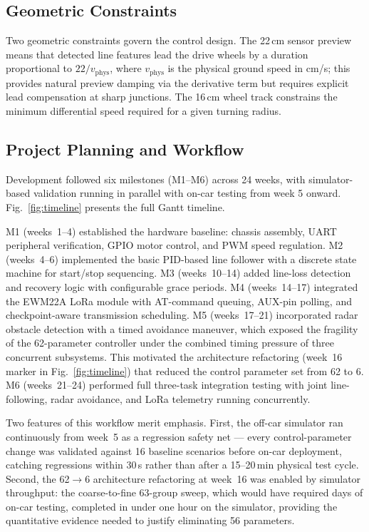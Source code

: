\documentclass[letterpaper,journal]{IEEEtran}
\begin{document}
\subsection{Geometric Constraints}

Two geometric constraints govern the control design. The 22\,cm sensor preview means that detected line features lead the drive wheels by a duration proportional to $22/v_{\text{phys}}$, where $v_{\text{phys}}$ is the physical ground speed in cm/s; this provides natural preview damping via the derivative term but requires explicit lead compensation at sharp junctions. The 16\,cm wheel track constrains the minimum differential speed required for a given turning radius.

\subsection{Project Planning and Workflow}

Development followed six milestones (M1--M6) across 24 weeks, with simulator-based validation running in parallel with on-car testing from week 5 onward. Fig.~\ref{fig:timeline} presents the full Gantt timeline.

M1 (weeks~1--4) established the hardware baseline: chassis assembly, UART peripheral verification, GPIO motor control, and PWM speed regulation. M2 (weeks~4--6) implemented the basic PID-based line follower with a discrete state machine for start/stop sequencing. M3 (weeks~10--14) added line-loss detection and recovery logic with configurable grace periods. M4 (weeks~14--17) integrated the EWM22A LoRa module with AT-command queuing, AUX-pin polling, and checkpoint-aware transmission scheduling. M5 (weeks~17--21) incorporated radar obstacle detection with a timed avoidance maneuver, which exposed the fragility of the 62-parameter controller under the combined timing pressure of three concurrent subsystems. This motivated the architecture refactoring (week~16 marker in Fig.~\ref{fig:timeline}) that reduced the control parameter set from 62 to 6. M6 (weeks~21--24) performed full three-task integration testing with joint line-following, radar avoidance, and LoRa telemetry running concurrently.

Two features of this workflow merit emphasis. First, the off-car simulator ran continuously from week~5 as a regression safety net --- every control-parameter change was validated against 16 baseline scenarios before on-car deployment, catching regressions within 30\,s rather than after a 15--20\,min physical test cycle. Second, the 62$\rightarrow$6 architecture refactoring at week~16 was enabled by simulator throughput: the coarse-to-fine 63-group sweep, which would have required days of on-car testing, completed in under one hour on the simulator, providing the quantitative evidence needed to justify eliminating 56 parameters.
\end{document}
